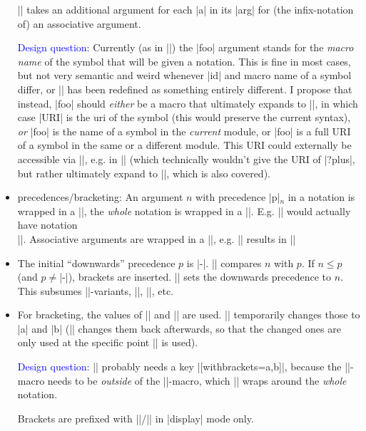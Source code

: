 \documentclass{bluenote}
\def\designquestion#1{\textcolor{blue}{#1}}
\begin{document}
\begin{itemize}
    |\notation| takes an additional argument for each |a| in its |arg| for (the infix-notation
    of) an associative argument.

    \designquestion{Design question:} Currently (as in |\symvariant|) the |foo| argument stands for the \emph{macro name}
    of the symbol that will be given a notation. This is fine in most cases, but not very semantic and
    weird whenever |id| and macro name of a symbol differ, or |\foo| has been redefined as something
    entirely different. I propose that instead, |foo| should \emph{either} be a macro
    that ultimately expands to ||, in which case |URI| is the uri
    of the symbol (this would preserve the current syntax), \emph{or} |foo| is the name 
    of a symbol in the \emph{current} module, or |foo| is a full URI of a symbol in
    the same or a different module. This URI could externally be accessible via 
    |\invoke@module|, e.g. in || (which
    technically wouldn't give the URI of |?plus|, but rather ultimately expand to
    ||, which is also covered).

  \item precedences/bracketing: An argument $n$ with precedence |p|$_n$ in a notation is 
  wrapped in a ||, the \emph{whole} notation is wrapped in a
  ||. E.g. || would
  actually have notation\\ 
  ||.
  Associative arguments are wrapped in a |\notation@assoc|, e.g.
  || results in 
  ||
  \item The initial ``downwards'' precedence $p$ is |-\infprec|. ||
    compares $n$ with $p$. If $n\leq p$ (and $p\neq$|-\infprec|), brackets are inserted.
    || sets the downwards precedence to $n$. This subsumes
    |\mixfix|-variants, |\prefix|, |\suffix|, etc.
  \item For bracketing, the values of |\notation@lparen| and |\notation@rparen| are used.
    || temporarily changes those to |a| and |b| 
    (|\notation@symprec| changes them back afterwards, so that the changed ones are only used
    at the specific point |\withbrackets| is used).

    \designquestion{Design question:} |\notation| probably needs a key 
    |[withbrackets={a,b}]|,
    because the |\withbrackets|-macro needs to be \emph{outside} of the 
    |\notation@symprec|-macro, which |\notation| wraps around the \emph{whole} notation.

    Brackets are prefixed with |\left|/|\right| in |display| mode only.
\end{itemize}
\end{document}

